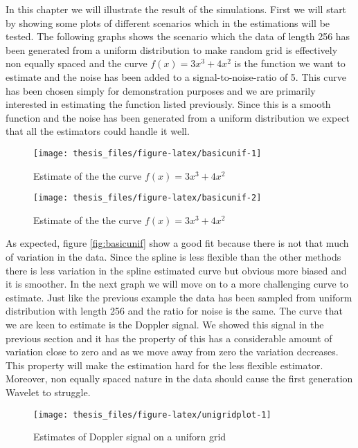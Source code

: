 \documentclass[12pt,twoside, a4paper]{reedthesis}
\begin{document}
In this chapter we will illustrate the result of the simulations. First we will start by showing some plots of different scenarios which in the estimations will be tested. The following graphs shows the scenario which the data of length 256 has been generated from a uniform distribution to make random grid is effectively non equally spaced and the curve \(f(x)=3x^3+4x^2\) is the function we want to estimate and the noise has been added to a signal-to-noise-ratio of 5. This curve has been chosen simply for demonstration purposes and we are primarily interested in estimating the function listed previously. Since this is a smooth function and the noise has been generated from a uniform distribution we expect that all the estimators could handle it well.
\begin{figure}[htb!]

{\centering \texttt{[image: thesis\_files/figure-latex/basicunif-1]} 

}

\caption{\label{fig:basicunif} Estimate of the the curve $f(x)=3x^3+4x^2$}\label{fig:basicunif1}
\end{figure}
\begin{figure}[htb!]

{\centering \texttt{[image: thesis\_files/figure-latex/basicunif-2]} 

}

\caption{\label{fig:basicunif} Estimate of the the curve $f(x)=3x^3+4x^2$}\label{fig:basicunif2}
\end{figure}
As expected, figure \ref{fig:basicunif} show a good fit because there is not that much of variation in the data. Since the spline is less flexible than the other methods there is less variation in the spline estimated curve but obvious more biased and it is smoother.
In the next graph we will move on to a more challenging curve to estimate. Just like the previous example the data has been sampled from uniform distribution with length 256 and the ratio for noise is the same. The curve that we are keen to estimate is the Doppler signal. We showed this signal in the previous section and it has the property of this has a considerable amount of variation close to zero and as we move away from zero the variation decreases. This property will make the estimation hard for the less flexible estimator. Moreover, non equally spaced nature in the data should cause the first generation Wavelet to struggle.
\begin{figure}[htb!]

{\centering \texttt{[image: thesis\_files/figure-latex/unigridplot-1]} 

}

\caption{\label{fig:unigridplot} Estimates of Doppler signal on a uniforn grid}\label{fig:unigridplot1}
\end{figure}
\end{document}
